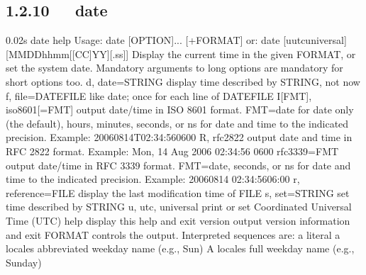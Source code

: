 \documentclass[letterpaper,12pt,english]{sphinxmanual}
\begin{document}
\subsection{1.2.10   date}
\label{\detokenize{001software/001install/linux:date}}
\begin{sphinxVerbatim}[commandchars=\\\{\}]
0.02s\PYGZdl{} date \PYGZhy{}\PYGZhy{}help
Usage: date [OPTION]... [+FORMAT]
  or:  date [\PYGZhy{}u\textbar{}\PYGZhy{}\PYGZhy{}utc\textbar{}\PYGZhy{}\PYGZhy{}universal] [MMDDhhmm[[CC]YY][.ss]]
Display the current time in the given FORMAT, or set the system date.
Mandatory arguments to long options are mandatory for short options too.
  \PYGZhy{}d, \PYGZhy{}\PYGZhy{}date=STRING          display time described by STRING, not \PYGZsq{}now\PYGZsq{}
  \PYGZhy{}f, \PYGZhy{}\PYGZhy{}file=DATEFILE        like \PYGZhy{}\PYGZhy{}date; once for each line of DATEFILE
  \PYGZhy{}I[FMT], \PYGZhy{}\PYGZhy{}iso\PYGZhy{}8601[=FMT]  output date/time in ISO 8601 format.
                               FMT=\PYGZsq{}date\PYGZsq{} for date only (the default),
                               \PYGZsq{}hours\PYGZsq{}, \PYGZsq{}minutes\PYGZsq{}, \PYGZsq{}seconds\PYGZsq{}, or \PYGZsq{}ns\PYGZsq{}
                               for date and time to the indicated precision.
                               Example: 2006\PYGZhy{}08\PYGZhy{}14T02:34:56\PYGZhy{}0600
  \PYGZhy{}R, \PYGZhy{}\PYGZhy{}rfc\PYGZhy{}2822             output date and time in RFC 2822 format.
                               Example: Mon, 14 Aug 2006 02:34:56 \PYGZhy{}0600
      \PYGZhy{}\PYGZhy{}rfc\PYGZhy{}3339=FMT         output date/time in RFC 3339 format.
                               FMT=\PYGZsq{}date\PYGZsq{}, \PYGZsq{}seconds\PYGZsq{}, or \PYGZsq{}ns\PYGZsq{}
                               for date and time to the indicated precision.
                               Example: 2006\PYGZhy{}08\PYGZhy{}14 02:34:56\PYGZhy{}06:00
  \PYGZhy{}r, \PYGZhy{}\PYGZhy{}reference=FILE       display the last modification time of FILE
  \PYGZhy{}s, \PYGZhy{}\PYGZhy{}set=STRING           set time described by STRING
  \PYGZhy{}u, \PYGZhy{}\PYGZhy{}utc, \PYGZhy{}\PYGZhy{}universal     print or set Coordinated Universal Time (UTC)
      \PYGZhy{}\PYGZhy{}help     display this help and exit
      \PYGZhy{}\PYGZhy{}version  output version information and exit
FORMAT controls the output.  Interpreted sequences are:
  \PYGZpc{}\PYGZpc{}   a literal \PYGZpc{}
  \PYGZpc{}a   locale\PYGZsq{}s abbreviated weekday name (e.g., Sun)
  \PYGZpc{}A   locale\PYGZsq{}s full weekday name (e.g., Sunday)

\end{sphinxVerbatim}
\end{document}

